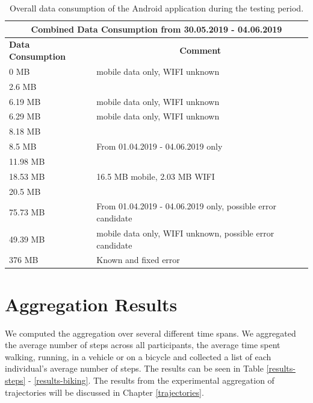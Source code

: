 \begin{table}[h!]
	\centering
	\begin{tabular}{|l|l|}
		\hline
		\multicolumn{2}{|c|}{\textbf{Combined Data Consumption from 30.05.2019 - 04.06.2019}}                     \\ \hline
		\textbf{Data Consumption} & \multicolumn{1}{c|}{\textbf{Comment}}                       \\ \hline
		0 MB                               & mobile data only, WIFI unknown                              \\ \hline
		2.6 MB                             &                                                             \\ \hline
		6.19 MB                            & mobile data only, WIFI unknown                              \\ \hline
		6.29 MB                            & mobile data only, WIFI unknown                              \\ \hline
		8.18 MB                            &                                                             \\ \hline
		8.5 MB                             & From 01.04.2019 - 04.06.2019 only                           \\ \hline
		11.98 MB                           &                                                             \\ \hline
		18.53 MB                           & 16.5 MB mobile, 2.03 MB WIFI                                \\ \hline
		20.5 MB                            &                                                             \\ \hline
		75.73 MB                           & From 01.04.2019 - 04.06.2019 only, possible error candidate \\ \hline
		49.39 MB                           & mobile data only, WIFI unknown, possible error candidate    \\ \hline
		376 MB                             & Known and fixed error                                       \\ \hline
	\end{tabular}
	\caption{Overall data consumption of the Android application during the testing period.}
	\label{data-consumption}
\end{table}

\section{Aggregation Results}\label{results}
We computed the aggregation over several different time spans. We aggregated the average number of steps across all participants, the average time spent walking, running, in a vehicle or on a bicycle and collected a list of each individual's average number of steps. The results can be seen in Table \ref{results-steps} - \ref{results-biking}. The results from the experimental aggregation of trajectories will be discussed in Chapter \ref{trajectories}.


